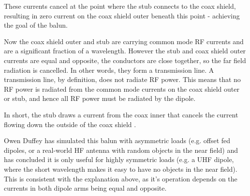 \documentclass{article}
\begin{document}
These currents cancel at the point where the stub connects to the coax shield, resulting in zero current on the coax shield outer beneath this point - achieving the goal of the balun.

Now the coax shield outer and stub are carrying common mode RF currents and are a significant fraction of a wavelength. However the stub and coax shield outer currents are equal and opposite, the conductors are close together, so the far field radiation is cancelled.  In other words, they form a transmission line.  A transmission line, by definition, does not radiate RF power. This means that no RF power is radiated from the common mode currents on the coax shield outer or stub, and hence all RF power must be radiated by the dipole.

In short, the stub draws a current from the coax inner that cancels the current flowing down the outside of the coax shield \cite{antenna_theory}.

Owen Duffey \cite{duffey} has simulated this balun with asymmetric loads (e.g. offset fed dipoles, or a real-world HF antenna with random objects in the near field) and has concluded it is only useful for highly symmetric loads (e.g. a UHF dipole, where the short wavelength makes it easy to have no objects in the near field).  This is consistent with the explanation above, as it's operation depends on the currents in both dipole arms being equal and opposite.



\end{document}
